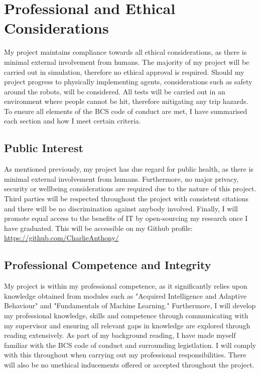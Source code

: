 \documentclass[12pt]{article}
\begin{document}
\section{Professional and Ethical Considerations}
My project maintains compliance towards all ethical considerations, as there is minimal external involvement from
humans. The majority of my project will be carried out in simulation, therefore no ethical approval is required. Should
my project progress to physically implementing agents, considerations such as safety around the robots, will be considered.
All tests will be carried out in an environment where people cannot be hit, therefore mitigating any trip hazards.\\

To ensure all elements of the BCS code of conduct are met, I have summarised each section and how I meet certain criteria. \\
\subsection{Public Interest}
As mentioned previously, my project has due regard for public health, as there is minimal external involvement from humans.
Furthermore, no major privacy, security or wellbeing considerations are required due to the nature of this project. Third parties
will be respected throughout the project with consistent citations and there will be no discrimination against anybody involved.
Finally, I will promote equal access to the benefits of IT by open-sourcing my research once I have graduated. This will be accessible
on my Github profile: \href{https://github.com/CharlieAnthony/}{https://github.com/CharlieAnthony/} \\
\subsection{Professional Competence and Integrity}
My project is within my professional competence, as it significantly relies upon knowledge obtained from modules such as "Acquired
Intelligence and Adaptive Behaviour" and "Fundamentals of Machine Learning." Furthermore, I will develop my professional knowledge,
skills and competence through communicating with my supervisor and ensuring all relevant gaps in knowledge are explored through
reading extensively. As part of my background reading, I have made myself familiar with the BCS code of conduct and surrounding
legistlation. I will comply with this throughout when carrying out my professional responsibilities. There will also
be no unethical inducements offered or accepted throughout the project. \\
\end{document}
